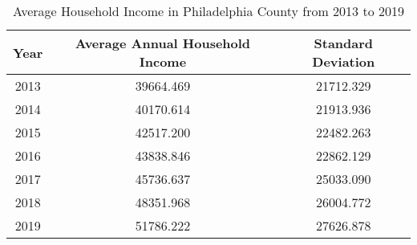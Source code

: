 \begin{table}[ht]
\centering
\begin{tabular}{|c|c|c|}
\hline
Year & Average Annual Household Income & Standard Deviation \\ \hline
2013 & 39664.469 & 21712.329 \\ \hline
2014 & 40170.614 & 21913.936 \\ \hline
2015 & 42517.200 & 22482.263 \\ \hline
2016 & 43838.846 & 22862.129 \\ \hline
2017 & 45736.637 & 25033.090 \\ \hline
2018 & 48351.968 & 26004.772 \\ \hline
2019 & 51786.222 & 27626.878 \\ \hline
\end{tabular}
\caption{Average Household Income in Philadelphia County from 2013 to 2019}
\end{table}